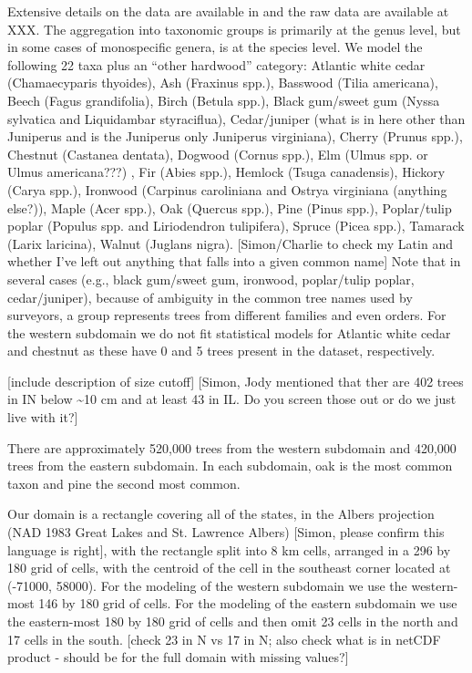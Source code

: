 \documentclass[12pt]{article}\usepackage[]{graphicx}\usepackage[]{color}
\begin{document}
Extensive details on the data are available in \cite{Gori:etal:2015}
and the raw data are available at XXX. The aggregation into taxonomic
groups is primarily at the genus level, but in some cases of monospecific
genera, is at the species level. We model the following 22 taxa plus
an ``other hardwood'' category: Atlantic white cedar (Chamaecyparis
thyoides), Ash (Fraxinus spp.), Basswood (Tilia americana), Beech
(Fagus grandifolia), Birch (Betula spp.), Black gum/sweet gum (Nyssa
sylvatica and Liquidambar styraciflua), Cedar/juniper (what is in
here other than Juniperus and is the Juniperus only Juniperus virginiana),
Cherry (Prunus spp.), Chestnut (Castanea dentata), Dogwood (Cornus
spp.), Elm (Ulmus spp. or Ulmus americana???) , Fir (Abies spp.),
Hemlock (Tsuga canadensis), Hickory (Carya spp.), Ironwood (Carpinus
caroliniana and Ostrya virginiana (anything else?)), Maple (Acer spp.),
Oak (Quercus spp.), Pine (Pinus spp.), Poplar/tulip poplar (Populus
spp. and Liriodendron tulipifera), Spruce (Picea spp.), Tamarack (Larix
laricina), Walnut (Juglans nigra). {[}Simon/Charlie to check my Latin
and whether I've left out anything that falls into a given common
name{]} Note that in several cases (e.g., black gum/sweet gum, ironwood,
poplar/tulip poplar, cedar/juniper), because of ambiguity in the common
tree names used by surveyors, a group represents trees from different
families and even orders. For the western subdomain we do not fit
statistical models for Atlantic white cedar and chestnut as these
have 0 and 5 trees present in the dataset, respectively.

{[}include description of size cutoff{]} {[}Simon, Jody mentioned
that ther are 402 trees in IN below \textasciitilde{}10 cm and at
least 43 in IL. Do you screen those out or do we just live with it?{]}

There are approximately 520,000 trees from the western subdomain and
420,000 trees from the eastern subdomain. In each subdomain, oak is
the most common taxon and pine the second most common. 

Our domain is a rectangle covering all of the states, in the Albers
projection (NAD 1983 Great Lakes and St. Lawrence Albers) {[}Simon,
please confirm this language is right{]}, with the rectangle split
into 8 km cells, arranged in a 296 by 180 grid of cells, with the
centroid of the cell in the southeast corner located at (-71000, 58000).
For the modeling of the western subdomain we use the western-most
146 by 180 grid of cells. For the modeling of the eastern subdomain
we use the eastern-most 180 by 180 grid of cells and then omit 23
cells in the north and 17 cells in the south. {[}check 23 in N vs
17 in N; also check what is in netCDF product - should be for the
full domain with missing values?{]}
\end{document}
